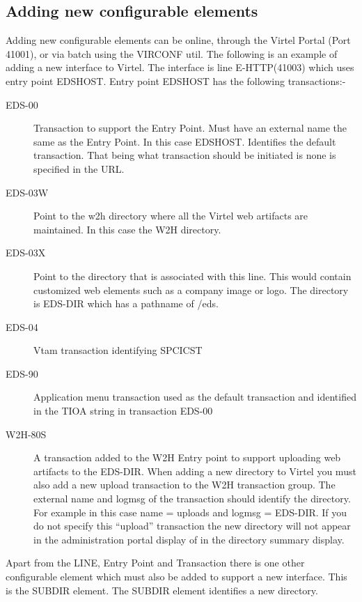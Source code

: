 \documentclass[letterpaper,10pt,english]{sphinxmanual}
\begin{document}
\subsection{Adding new configurable elements}
\label{\detokenize{connectivity_guide:adding-new-configurable-elements}}
Adding new configurable elements can be online, through the Virtel Portal (Port 41001), or via batch using the VIRCONF util. The following is an example of adding a new interface to Virtel. The interface is line E-HTTP(41003) which uses entry point EDSHOST. Entry point EDSHOST has the following transactions:-
\begin{description}
\item[{EDS-00}] \leavevmode
Transaction to support the Entry Point. Must have an external name the same as the Entry Point. In this case EDSHOST. Identifies the default transaction. That being what transaction should be initiated is none is specified in the URL.

\item[{EDS-03W}] \leavevmode
Point to the w2h directory where all the Virtel web artifacts are maintained. In this case the W2H directory.

\item[{EDS-03X}] \leavevmode
Point to the directory that is associated with this line. This would contain customized web elements such as a company image or logo. The directory is EDS-DIR which has a pathname of /eds.

\item[{EDS-04}] \leavevmode
Vtam transaction identifying SPCICST

\item[{EDS-90}] \leavevmode
Application menu transaction used as the default transaction and identified in the TIOA string in transaction EDS-00

\item[{W2H-80S}] \leavevmode
A transaction added to the W2H Entry point to support uploading web artifacts to the EDS-DIR. When adding a new directory to Virtel you must also add a new upload transaction to the W2H transaction group. The external name and logmsg of the transaction should identify the directory. For example in this case name = uploads and logmsg = EDS-DIR. If you do not specify this “upload” transaction the new directory will not appear in the administration portal display of in the directory summary display.

\end{description}

Apart from the LINE, Entry Point and Transaction there is one other configurable element which must also be added to support a new interface. This is the SUBDIR element. The SUBDIR element identifies a new directory.
\end{document}
